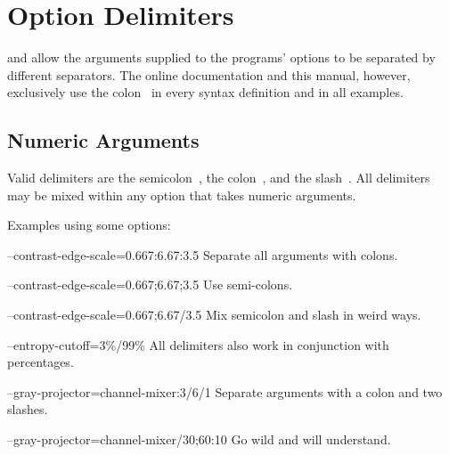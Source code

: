 

\section[Option Delimiters\commonpart]{\label{sec:option-delimiters}%
  Option Delimiters\commonpart}

\App{} and \OtherApp{} allow the arguments supplied to the programs' options to be separated by
different separators.  The online documentation and this manual, however, exclusively use the
colon~\sample{:} in every syntax definition and in all examples.


\subsection[Numeric Arguments]{\label{sec:option-delimiters-numeric-arguments}%
  Numeric Arguments}

Valid delimiters are the semicolon~\sample{;}, the colon~\sample{:}, and the slash~\sample{/}.
All delimiters may be mixed within any option that takes numeric arguments.

Examples using some  options:

\begin{codelist}
\item[--contrast-edge-scale=0.667:6.67:3.5]\itemend
  Separate all arguments with colons.

\item[--contrast-edge-scale=0.667;6.67;3.5]\itemend
  Use semi-colons.

\item[--contrast-edge-scale=0.667;6.67/3.5]\itemend
  Mix semicolon and slash in weird ways.

\item[--entropy-cutoff=3\%/99\%]\itemend
  All delimiters also work in conjunction with percentages.

\item[--gray-projector=channel-mixer:3/6/1]\itemend
  Separate arguments with a colon and two slashes.

\item[--gray-projector=channel-mixer/30;60:10]\itemend
  Go wild and  will understand.
\end{codelist}



